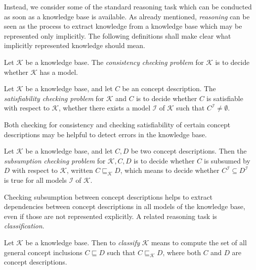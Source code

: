 Instead, we consider some of the standard reasoning task which can be conducted as soon as
a knowledge base is available.  As already mentioned, \emph{reasoning} can be seen as the
process to extract knowledge from a knowledge base which may be represented only
implicitly.  The following definitions shall make clear what implicitly represented
knowledge should mean.

\begin{Definition}
  \label{def:concistency-checking}
  Let $\mathcal{K}$ be a knowledge base.  The \emph{consistency checking problem} for
  $\mathcal{K}$ is to decide whether $\mathcal{K}$ has a model.
\end{Definition}

\begin{Definition}
  \label{def:satisfiability-checking}
  Let $\mathcal{K}$ be a knowledge base, and let $C$ be an \ELbot concept description.
  The \emph{satisfiability checking problem} for $\mathcal{K}$ and $C$ is to decide
  whether $C$ is satisfiable with respect to $\mathcal{K}$, \ie whether there exists a
  model $\mathcal{I}$ of $\mathcal{K}$ such that $C^{\mathcal{I}} \neq \emptyset$.
\end{Definition}

Both checking for consistency and checking satisfiability of certain concept descriptions
may be helpful to detect errors in the knowledge base.

\begin{Definition}
  \label{def:subsumption-checking}
  Let $\mathcal{K}$ be a knowledge base, and let $C, D$ be two \ELbot concept
  descriptions.  Then the \emph{subsumption checking problem} for $\mathcal{K}, C, D$ is
  to decide whether $C$ is subsumed by $D$ with respect to $\mathcal{K}$, written $C
  \sqsubseteq_{\mathcal{K}} D$, which means to decide whether $C^{\mathcal{I}} \subseteq
  D^{\mathcal{I}}$ is true for all models $\mathcal{I}$ of $\mathcal{K}$.
\end{Definition}

Checking subsumption between concept descriptions helps to extract dependencies between
concept descriptions in all models of the knowledge base, even if those are not
represented explicitly.  A related reasoning task is \emph{classification}.

\begin{Definition}[Classification]
  \label{def:classification}
  Let $\mathcal{K}$ be a knowledge base.  Then to \emph{classify} $\mathcal{K}$ means to
  compute the set of all general concept inclusions $C \sqsubseteq D$ such that $C
  \sqsubseteq_{\mathcal{K}} D$, where both $C$ and $D$ are \ELbot concept descriptions.
\end{Definition}


